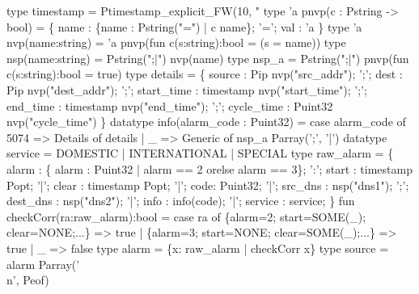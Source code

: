 \begin{code}
type timestamp = Ptimestamp_explicit_FW(10, "%
\mbox{}
type 'a pnvp(c : Pstring -> bool) =
      \{ name : \{name : Pstring("=") | c name\};
        '=';
        val : 'a \}
type 'a nvp(name:string) = 'a pnvp(fun c(s:string):bool = (s = name))
type nsp(name:string) = Pstring(";|") nvp(name)
type nsp_a = Pstring(";|") pnvp(fun c(s:string):bool = true)
\mbox{}
type details = \{
      source      : Pip nvp("src_addr");
';';  dest        : Pip nvp("dest_addr");
';';  start_time  : timestamp nvp("start_time");
';';  end_time    : timestamp nvp("end_time");
';';  cycle_time  : Puint32 nvp("cycle_time")
\}
\mbox{}
datatype info(alarm_code : Puint32) =
  case alarm_code of 
    5074 => Details of details
  | _    => Generic of nsp_a Parray(';', '|')
\mbox{}
datatype service =
    DOMESTIC
  | INTERNATIONAL
  | SPECIAL
\mbox{}
type raw_alarm = \{
       alarm    :  \{ alarm : Puint32 | alarm == 2 orelse alarm == 3\};
 ':';  start :  timestamp Popt;
 '|';  clear :  timestamp Popt;
 '|';  code: Puint32;
 '|';  src_dns  :  nsp("dns1");
 ';';  dest_dns :  nsp("dns2");
 '|';  info     :  info(code);
 '|';  service  :  service;
\}
\mbox{}
fun checkCorr(ra:raw_alarm):bool =
  case ra of 
    \{alarm=2; start=SOME(_); clear=NONE;...\} => true
  | \{alarm=3; start=NONE;    clear=SOME(_);...\} => true
  |  _ => false
\mbox{}
type alarm = \{x: raw_alarm | checkCorr x\}
\mbox{}
type source = alarm Parray('\\n', Peof)
\end{code}
